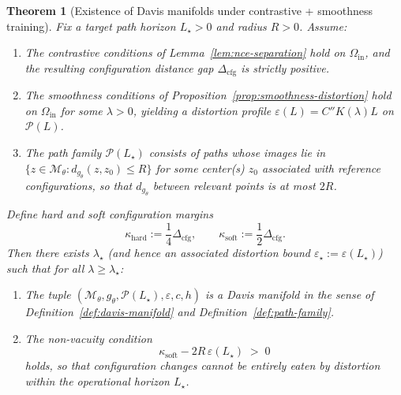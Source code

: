 \documentclass[11pt]{article}
\newtheorem{theorem}{Theorem}
\begin{document}
\begin{theorem}[Existence of Davis manifolds under contrastive + smoothness training]
\label{thm:existence}
Fix a target path horizon $L_\star > 0$ and radius $R>0$. Assume:
\begin{enumerate}[label=(D\arabic*),leftmargin=*]
  \item The contrastive conditions of Lemma~\ref{lem:nce-separation} hold on $\Omega_{\mathrm{in}}$,
    and the resulting configuration distance gap $\Delta_{\mathrm{cfg}}$ is strictly positive.
  \item The smoothness conditions of Proposition~\ref{prop:smoothness-distortion} hold on
    $\Omega_{\mathrm{in}}$ for some $\lambda>0$, yielding a distortion profile
    $\varepsilon(L) = C'' K(\lambda) L$ on $\mathcal{P}(L)$.
  \item The path family $\mathcal{P}(L_\star)$ consists of paths whose images lie in
    $\{z \in \mathcal{M}_\theta : d_{g_\theta}(z,z_0) \le R\}$ for some center(s) $z_0$ associated
    with reference configurations, so that $d_{g_\theta}$ between relevant points is at most $2R$.
\end{enumerate}
Define hard and soft configuration margins
\[
\kappa_{\mathrm{hard}} := \frac{1}{4}\Delta_{\mathrm{cfg}},
\qquad
\kappa_{\mathrm{soft}} := \frac{1}{2}\Delta_{\mathrm{cfg}}.
\]
Then there exists $\lambda_\star$ (and hence an associated distortion bound
$\varepsilon_\star := \varepsilon(L_\star)$) such that for all $\lambda \ge \lambda_\star$:
\begin{enumerate}[label=(E\arabic*),leftmargin=*]
  \item The tuple
    $(\mathcal{M}_\theta, g_\theta, \mathcal{P}(L_\star), \varepsilon, c, h)$ is a Davis manifold in
    the sense of Definition~\ref{def:davis-manifold} and Definition~\ref{def:path-family}.
  \item The non-vacuity condition
    \[
      \kappa_{\mathrm{soft}} - 2R\,\varepsilon(L_\star) \;>\; 0
    \]
    holds, so that configuration changes cannot be entirely eaten by distortion within the
    operational horizon $L_\star$.
\end{enumerate}
\end{theorem}
\end{document}
